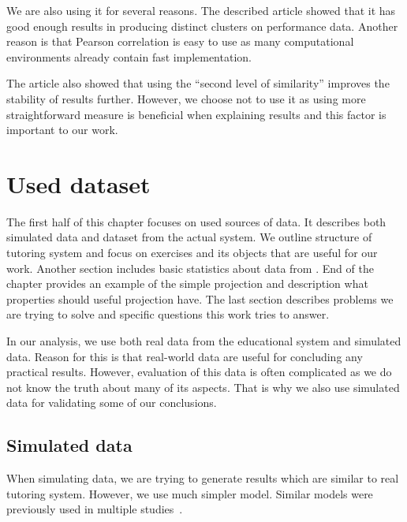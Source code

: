 \documentclass[
  printed, %
  table,   %
  nolof,     %
  nolot,     %
  color,
  final,
  nocover
]{fithesis3}
\begin{document}
We are also using it for several reasons. The described article showed that it has good enough results in producing distinct clusters on performance data. Another reason is that Pearson correlation is easy to use as many computational environments already contain fast implementation.

The article also showed that using the ``second level of similarity'' improves the stability of results further. However, we choose not to use it as using more straightforward measure is beneficial when explaining results and this factor is important to our work.


\chapter{Used dataset}\label{used-dataset}

The first half of this chapter focuses on used sources of data. It describes both simulated data and dataset from the actual system. We outline structure of tutoring system and focus on exercises and its objects that are useful for our work. Another section includes basic statistics about data from \umimeCesky{}. End of the chapter provides an example of the simple projection and description what properties should useful projection have. The last section describes problems we are trying to solve and specific questions this work tries to answer.


In our analysis, we use both real data from the educational system and simulated data. Reason for this is that real-world data are useful for concluding any practical results. However, evaluation of this data is often complicated as we do not know the truth about many of its aspects. That is why we also use simulated data for validating some of our conclusions.


\section{Simulated data}\label{simulated-data}

When simulating data, we are trying to generate results which are similar to real tutoring system. However, we use much simpler model. Similar models were previously used in multiple studies~\cite{piech2015deep, pelanek2017measuring}.
\end{document}
